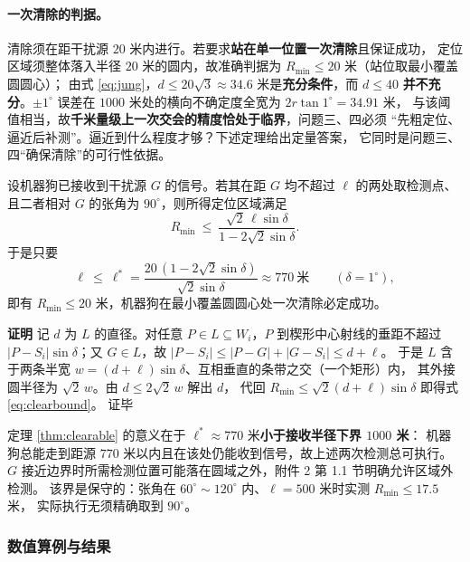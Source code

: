 \documentclass[withoutpreface, bwprint]{cumcmthesis}
\renewenvironment{proof}{\par\noindent\textbf{证明}\quad}{\hfill 证毕\par\medskip}
\begin{document}
\paragraph{一次清除的判据。}
清除须在距干扰源 $20$ 米内进行。若要求\textbf{站在单一位置一次清除}且保证成功，
定位区域须整体落入半径 $20$ 米的圆内，故准确判据为 $R_{\min}\le 20$ 米（站位取最小覆盖圆圆心）；
由式 \eqref{eq:jung}，$d\le 20\sqrt3\approx34.6$ 米是\textbf{充分条件}，而 $d\le 40$
\textbf{并不充分}。$\pm1^\circ$ 误差在 $1000$ 米处的横向不确定度全宽为 $2r\tan1^\circ=34.91$ 米，
与该阈值相当，故\textbf{千米量级上一次交会的精度恰处于临界}，问题三、四必须
“先粗定位、逼近后补测”。逼近到什么程度才够？下述定理给出定量答案，
它同时是问题三、四“确保清除”的可行性依据。

\begin{theorem}[可清除性保证]
\label{thm:clearable}
设机器狗已接收到干扰源 $G$ 的信号。若其在距 $G$ 均不超过 $\ell$ 的两处取检测点、
且二者相对 $G$ 的张角为 $90^\circ$，则所得定位区域满足
\begin{equation}
  \label{eq:clearbound}
  R_{\min}\ \le\ \frac{\sqrt2\,\ell\sin\delta}{1-2\sqrt2\sin\delta}.
\end{equation}
于是只要
\begin{equation}
  \label{eq:ellstar}
  \ell\ \le\ \ell^{*}=\frac{20\,(1-2\sqrt2\sin\delta)}{\sqrt2\sin\delta}\approx 770\ \text{米}
  \qquad(\delta=1^\circ),
\end{equation}
即有 $R_{\min}\le20$ 米，机器狗在最小覆盖圆圆心处一次清除必定成功。
\end{theorem}

\begin{proof}
记 $d$ 为 $L$ 的直径。对任意 $P\in L\subseteq W_i$，$P$ 到楔形中心射线的垂距不超过
$|P-S_i|\sin\delta$；又 $G\in L$，故 $|P-S_i|\le|P-G|+|G-S_i|\le d+\ell$。
于是 $L$ 含于两条半宽 $w=(d+\ell)\sin\delta$、互相垂直的条带之交（一个矩形）内，
其外接圆半径为 $\sqrt2\,w$。由 $d\le 2\sqrt2\,w$ 解出 $d$，
代回 $R_{\min}\le\sqrt2(d+\ell)\sin\delta$ 即得式 \eqref{eq:clearbound}。
\end{proof}

定理 \ref{thm:clearable} 的意义在于 $\ell^{*}\approx770$ 米\textbf{小于接收半径下界 $1000$ 米}：
机器狗总能走到距源 $770$ 米以内且在该处仍能收到信号，故上述两次检测总可执行。
$G$ 接近边界时所需检测位置可能落在圆域之外，附件 2 第 1.1 节明确允许区域外检测。
该界是保守的：张角在 $60^\circ\sim120^\circ$ 内、$\ell=500$ 米时实测 $R_{\min}\le17.5$ 米，
实际执行无须精确取到 $90^\circ$。

\subsubsection{数值算例与结果}
\label{sec:p1num}
\end{document}

